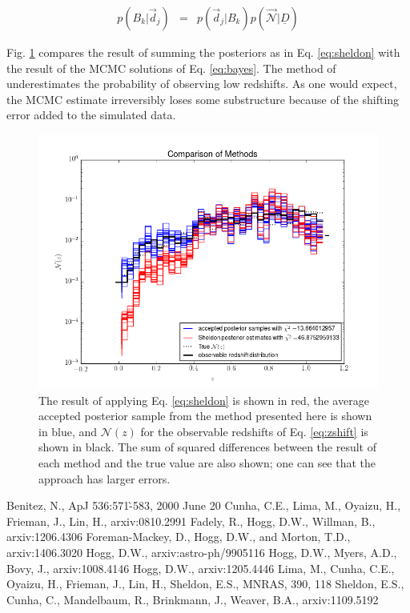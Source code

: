 \documentclass[12pt, onecolumn]{emulateapj}
\newcommand{\textul}{\underline}
\begin{document}
\begin{eqnarray}
\label{eq:posts}
p(B_{k}|\vec{d}_{j}) &=& p(\vec{d}_{j}|B_{k})p(\vec{\mathcal{N}}|\textul{D})
\end{eqnarray}

Fig. \ref{fig:sheldon} compares the result of summing the posteriors as in Eq. \ref{eq:sheldon} with the result of the MCMC solutions of Eq. \ref{eq:bayes}.  The method of \citet{she11} underestimates the probability of observing low redshifts.  As one would expect, the MCMC estimate irreversibly loses some substructure because of the shifting error added to the simulated data.

\begin{figure}
\label{fig:sheldon}
\includegraphics[scale=0.5]{compare-sheldon.png}
\caption{The result of applying Eq. \ref{eq:sheldon} is shown in red, the average accepted posterior sample from the method presented here is shown in blue, and $\mathcal{N}(z)$ for the observable redshifts of Eq. \ref{eq:zshift} is shown in black.  The sum of squared differences between the result of each method and the true value are also shown; one can see that the \citet{she11} approach has larger errors.}
\end{figure}



\begin{thebibliography}{}
Benitez, N., ApJ 536:571-̀583, 2000 June 20
Cunha, C.E., Lima, M., Oyaizu, H., Frieman, J., Lin, H., arxiv:0810.2991
Fadely, R., Hogg, D.W., Willman, B., arxiv:1206.4306
Foreman-Mackey, D., Hogg, D.W., and Morton, T.D., arxiv:1406.3020
Hogg, D.W., arxiv:astro-ph/9905116
Hogg, D.W., Myers, A.D., Bovy, J., arxiv:1008.4146
Hogg, D.W., arxiv:1205.4446
Lima, M., Cunha, C.E., Oyaizu, H., Frieman, J., Lin, H., Sheldon, E.S., MNRAS, 390, 118
Sheldon, E.S., Cunha, C., Mandelbaum, R., Brinkmann, J., Weaver, B.A., arxiv:1109.5192
\end{thebibliography}
\end{document}
